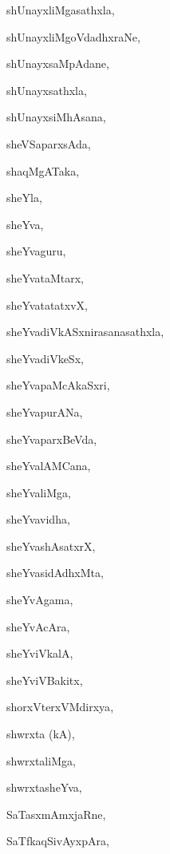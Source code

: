 \begin{multicols}{2}
{shUnayxliMgasathxla}, \pageref{shUnayxliMgasathxla}

{shUnayxliMgoVdadhxraNe}, \pageref{shUnayxliMgoVdadhxraNe}

{shUnayxsaMpAdane}, \pageref{shUnayxsaMpAdane}

{shUnayxsathxla}, \pageref{shUnayxsathxla}

{shUnayxsiMhAsana}, \pageref{shUnayxsiMhAsana}

{sheVSaparxsAda}, \pageref{sheVSaparxsAda}

{shaqMgATaka}, \pageref{shaqMgATaka}

{sheYla}, \pageref{sheYla}

{sheYva}, \pageref{sheYva}

{sheYvaguru}, \pageref{sheYvaguru}

{sheYvataMtarx}, \pageref{sheYvataMtarx}

{sheYvatatatxvX}, \pageref{sheYvatatatxvX}

{sheYvadiVkASxnirasanasathxla}, \pageref{sheYvadiVkASxnirasanasathxla}

{sheYvadiVkeSx}, \pageref{sheYvadiVkeSx}

{sheYvapaMcAkaSxri}, \pageref{sheYvapaMcAkaSxri}

{sheYvapurANa}, \pageref{sheYvapurANa}

{sheYvaparxBeVda}, \pageref{sheYvaparxBeVda}

{sheYvalAMCana}, \pageref{sheYvalAMCana}

{sheYvaliMga}, \pageref{sheYvaliMga}

{sheYvavidha}, \pageref{sheYvavidha}

{sheYvashAsatxrX}, \pageref{sheYvashAsatxrX}

{sheYvasidAdhxMta}, \pageref{sheYvasidAdhxMta}

{sheYvAgama}, \pageref{sheYvAgama}

{sheYvAcAra}, \pageref{sheYvAcAra}

{sheYviVkalA}, \pageref{sheYviVkalA}

{sheYviVBakitx}, \pageref{sheYviVBakitx}

{shorxVterxVMdirxya}, \pageref{shorxVterxVMdirxya}

{shwrxta (kA)}, \pageref{shwrxtakA}

{shwrxtaliMga}, \pageref{shwrxtaliMga}

{shwrxtasheYva}, \pageref{shwrxtasheYva}

{SaTasxmAmxjaRne}, \pageref{SaTasxmAmxjaRne}

{SaTfkaqSivAyxpAra}, \pageref{SaTfkaqSivAyxpAra}


\end{multicols}
